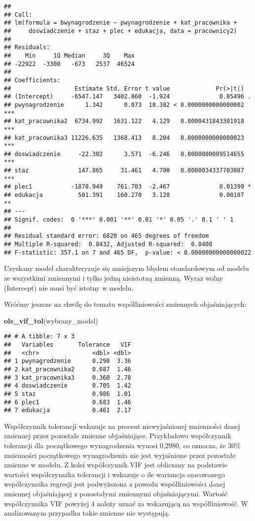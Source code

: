 \documentclass[]{book}
\newenvironment{Shaded}{\begin{snugshade}}{\end{snugshade}}
\newcommand{\KeywordTok}[1]{\textcolor[rgb]{0.13,0.29,0.53}{\textbf{#1}}}
\newcommand{\NormalTok}[1]{#1}
\begin{document}
\begin{verbatim}
## 
## Call:
## lm(formula = bwynagrodzenie ~ pwynagrodzenie + kat_pracownika + 
##     doswiadczenie + staz + plec + edukacja, data = pracownicy2)
## 
## Residuals:
##    Min     1Q Median     3Q    Max 
## -22922  -3300   -673   2537  46524 
## 
## Coefficients:
##                  Estimate Std. Error t value             Pr(>|t|)    
## (Intercept)     -6547.147   3402.860  -1.924              0.05496 .  
## pwynagrodzenie      1.342      0.073  18.382 < 0.0000000000000002 ***
## kat_pracownika2  6734.992   1631.122   4.129   0.0000431843301918 ***
## kat_pracownika3 11226.635   1368.413   8.204   0.0000000000000023 ***
## doswiadczenie     -22.302      3.571  -6.246   0.0000000009514655 ***
## staz              147.865     31.461   4.700   0.0000034337703087 ***
## plec1           -1878.949    761.703  -2.467              0.01399 *  
## edukacja          501.391    160.270   3.128              0.00187 ** 
## ---
## Signif. codes:  0 '***' 0.001 '**' 0.01 '*' 0.05 '.' 0.1 ' ' 1
## 
## Residual standard error: 6820 on 465 degrees of freedom
## Multiple R-squared:  0.8432, Adjusted R-squared:  0.8408 
## F-statistic: 357.1 on 7 and 465 DF,  p-value: < 0.00000000000000022
\end{verbatim}

Uzyskany model charakteryzuje się mniejszym błędem standardowym od
modelu ze wszystkimi zmiennymi i tylko jedną nieistotną zmienną. Wyraz
wolny (Intercept) nie musi być istotny w modelu.

Wróćmy jeszcze na chwilę do tematu współliniowości zmiennych
objaśniających:

\begin{Shaded}
\begin{Highlighting}[]
\KeywordTok{ols_vif_tol}\NormalTok{(wybrany_model)}
\end{Highlighting}
\end{Shaded}

\begin{verbatim}
## # A tibble: 7 x 3
##   Variables       Tolerance   VIF
##   <chr>               <dbl> <dbl>
## 1 pwynagrodzenie      0.298  3.36
## 2 kat_pracownika2     0.687  1.46
## 3 kat_pracownika3     0.360  2.78
## 4 doswiadczenie       0.705  1.42
## 5 staz                0.986  1.01
## 6 plec1               0.683  1.46
## 7 edukacja            0.461  2.17
\end{verbatim}

Współczynnik tolerancji wskazuje na procent niewyjaśnionej zmienności
danej zmiennej przez pozostałe zmienne objaśniające. Przykładowo
współczynnik tolerancji dla początkowego wynagrodzenia wynosi 0,2980, co
oznacza, że 30\% zmienności początkowego wynagrodzenia nie jest
wyjaśnione przez pozostałe zmienne w modelu. Z kolei współczynnik VIF
jest obliczany na podstawie wartości współczynnika tolerancji i wskazuje
o ile wariancja szacowanego współczynnika regresji jest podwyższona z
powodu współliniowości danej zmiennej objaśniającej z pozostałymi
zmiennymi objaśniającymi. Wartość współczynnika VIF powyżej 4 należy
uznać za wskazującą na współliniowość. W analizowanym przypadku takie
zmienne nie występują.
\end{document}
